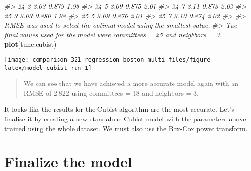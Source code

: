 \documentclass[]{book}
\newenvironment{Shaded}{\begin{snugshade}}{\end{snugshade}}
\newcommand{\CommentTok}[1]{\textcolor[rgb]{0.56,0.35,0.01}{\textit{#1}}}
\newcommand{\KeywordTok}[1]{\textcolor[rgb]{0.13,0.29,0.53}{\textbf{#1}}}
\newcommand{\NormalTok}[1]{#1}
\begin{document}
\begin{Shaded}
\begin{Highlighting}[]
\CommentTok{#>   24          3          3.03  0.879     1.98}
\CommentTok{#>   24          5          3.09  0.875     2.01}
\CommentTok{#>   24          7          3.11  0.873     2.02}
\CommentTok{#>   25          3          3.03  0.880     1.98}
\CommentTok{#>   25          5          3.09  0.876     2.01}
\CommentTok{#>   25          7          3.10  0.874     2.02}
\CommentTok{#> }
\CommentTok{#> RMSE was used to select the optimal model using the smallest value.}
\CommentTok{#> The final values used for the model were committees = 25 and neighbors = 3.}
\KeywordTok{plot}\NormalTok{(tune.cubist)}
\end{Highlighting}
\end{Shaded}

\begin{center}\texttt{[image: comparison\_321-regression\_boston-multi\_files/figure-latex/model-cubist-run-1]} \end{center}

\begin{quote}
We can see that we have achieved a more accurate model again with an RMSE of 2.822 using committees = 18 and neighbors = 3.
\end{quote}

It looks like the results for the Cubist algorithm are the most accurate. Let's finalize it by creating a new standalone Cubist model with the parameters above trained using the whole dataset. We must also use the Box-Cox power transform.

\hypertarget{finalize-the-model}{%
\section{Finalize the model}\label{finalize-the-model}}
\end{document}
